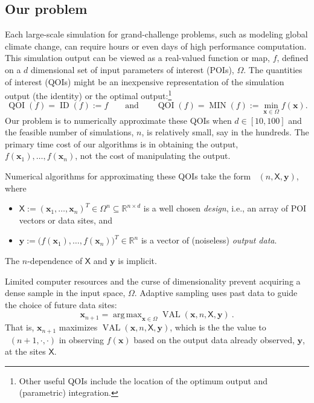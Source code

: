 \documentclass[11pt]{NSFamsart}
\DeclareMathOperator*{\argmax}{arg\,max}
\DeclareMathOperator{\QOI}{QOI} %
\DeclareMathOperator{\APP}{\widehat{\QOI}}
\DeclareMathOperator{\VAL}{VAL}
\DeclareMathOperator{\MIN}{MIN}
\DeclareMathOperator{\ID}{ID}
\newcommand{\reals}{{\mathbb{R}}}
\newcommand{\mX}{\mathsf{X}}
\newcommand{\bx}{{\boldsymbol{x}}}
\newcommand{\by}{{\boldsymbol{y}}}
\begin{document}
\subsection{Our problem}

Each large-scale simulation for grand-challenge problems, such as modeling global climate change, can require hours or even days of high performance computation.  This simulation output can be viewed as a real-valued function or map, $f$, defined on a $d$ dimensional set of input parameters of interest (POIs), $\Omega$.  The quantities of interest (QOIs) might be 
an inexpensive representation of the simulation output (the identity) or the optimal output:\footnote{Other useful QOIs include the location of the optimum output and (parametric) integration.}  
\begin{equation} \label{eq:ourQOIs}
    \QOI(f) = \ID(f) := f \qquad \text{and} \qquad \QOI(f) = \MIN(f) := \min_{\bx \in \Omega} f(\bx).
\end{equation}
Our problem is to numerically approximate these QOIs when $d \in [10, 100]$ and the feasible number of simulations, $n$, is relatively small, say in the hundreds.  The primary time cost of our algorithms is in obtaining the output, $f(\bx_1), \ldots, f(\bx_n)$, not the cost of manipulating the output.

Numerical algorithms for approximating these QOIs take the form $\APP(n,\mX,\by)$, where 
\begin{itemize}
    \item $\mX := (\bx_1, \ldots, \bx_n)^T \in \Omega^{n} \subseteq \reals^{n \times d}$ is a well chosen \emph{design}, i.e., an array of POI vectors or data sites, and
    
    \item $\by := \bigl(f(\bx_1), \ldots, f(\bx_n) \bigr)^T \in \reals^n$ is a vector of (noiseless) \emph{output data}.
\end{itemize}   
The $n$-dependence of $\mX$ and $\by$ is implicit.  

Limited computer resources and the curse of dimensionality prevent acquiring a dense sample in the input space, $\Omega$. Adaptive sampling uses past data to guide the choice of future data sites:   
\begin{equation} \label{eq:nextsample}
    \bx_{n+1} = \argmax_{\bx \in \Omega} \VAL(\bx,n,\mX, \by)~.
\end{equation}
That is, $\bx_{n+1}$ maximizes $\VAL(\bx,n,\mX, \by)$, which is the the value to $\APP(n+1,\cdot,\cdot)$ in observing $f(\bx)$ based on the output data already observed, $\by$, at the sites $\mX$.  
\end{document}
